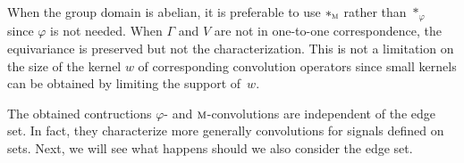 When the group domain is abelian, it is preferable to use $\ast_{\operatorname{\textsc{m}}}$ rather than $\ast_{\varphi}$ since $\varphi$ is not needed. When $\Gamma$ and $V$ are not in one-to-one correspondence, the equivariance is preserved but not the characterization. This is not a limitation on the size of the kernel $w$ of corresponding convolution operators since small kernels can be obtained by limiting the support of~$w$.

\vspace{5pt}

The obtained contructions $\varphi$- and $\operatorname{\textsc{m}}$-convolutions are independent of the edge set. In fact, they characterize more generally convolutions for signals defined on sets. Next, we will see what happens should we also consider the edge set.
